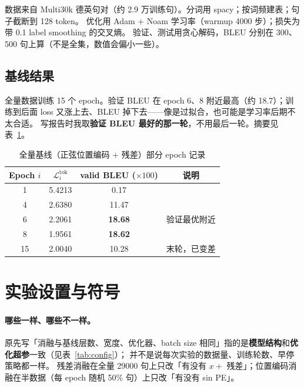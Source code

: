 \documentclass[UTF8,a4paper,11pt]{ctexart}
\newcommand{\Lt}{\mathcal{L}^{\mathrm{tok}}}
\newcommand{\Lti}[1]{\Lt_{#1}}
\begin{document}
数据来自 Multi30k 德英句对（约 2.9 万训练句）。分词用 spacy；按词频建表；句子截断到 128 token。
优化用 Adam + Noam 学习率（warmup 4000 步）；损失为带 0.1 label smoothing 的交叉熵。
验证、测试用贪心解码，BLEU 分别在 300、500 句上算（不是全集，数值会偏小一些）。

\subsection{基线结果}

全量数据训练 15 个 epoch。验证 BLEU 在 epoch 6、8 附近最高（约 18.7）；训练到后面 loss 又涨上去、BLEU 掉下去——像是过拟合，也可能是学习率后期不太合适。
写报告时我取\textbf{验证 BLEU 最好的那一轮}，不用最后一轮。摘要见表~\ref{tab:baseline}。

\begin{table}[htbp]
  \centering
  \caption{全量基线（正弦位置编码 + 残差）部分 epoch 记录}
  \label{tab:baseline}
  \begin{tabular}{cccc}
    \toprule
    Epoch $i$ & $\Lti{i}$ & valid BLEU ($\times 100$) & 说明 \\
    \midrule
    1 & 5.4213 & 0.17 &  \\
    4 & 2.6380 & 11.47 &  \\
    6 & 2.2061 & \textbf{18.68} & 验证最优附近 \\
    8 & 1.9561 & \textbf{18.62} &  \\
    15 & 2.0040 & 10.28 & 末轮，已变差 \\
    \bottomrule
  \end{tabular}
\end{table}

\section{实验设置与符号}

\paragraph{哪些一样、哪些不一样。}
原先写「消融与基线层数、宽度、优化器、batch size 相同」指的是\textbf{模型结构}和\textbf{优化超参}一致（见表~\ref{tab:config}）；
并不是说每次实验的数据量、训练轮数、早停策略都一样。
残差消融在全量 29000 句上只改「有没有 $x+$ 残差」；位置编码消融在半数据（每 epoch 随机 50\% 句）上只改「有没有 sin PE」。
\end{document}
